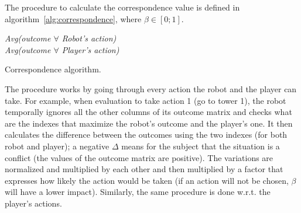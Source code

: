 The procedure to calculate the correspondence value is defined in algorithm~\ref{alg:correspondence}, where $\beta \in[0;1]$.
\begin{algorithm}[h]
\SetAlgoLined
{}
\BlankLine
\textit{Avg(outcome $\forall$ Robot's action)}\\
\textit{Avg(outcome $\forall$ Player's action)}\\

\caption{Correspondence algorithm.}
\label{alg:correspondence}
\end{algorithm}
The procedure works by going through every action the robot and the player can take. For example, when evaluation to take action 1 (go to tower 1), the robot temporally ignores all the other columns of its outcome matrix and checks what are the indexes that maximize the robot's outcome and the player's one. It then calculates the difference between the outcomes using the two indexes (for both robot and player); a negative $\Delta$ means for the subject that the situation is a conflict (the values of the outcome matrix are positive). The variations are normalized and multiplied by each other and then multiplied by a factor that expresses how likely the action would be taken (if an action will not be chosen, $\beta$ will have a lower impact). Similarly, the same procedure is done w.r.t. the player's actions.

